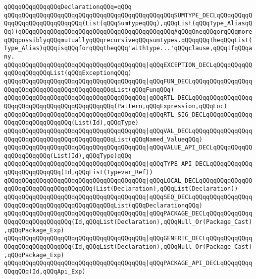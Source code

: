 \verb|qQQqqQQqqQQqqQQqDeclarationqQQq=qQQq|\newline
\verb|qQQqqQQqqQQqqQQqqQQqqQQqqQQqqQQqqQQqqQQqqQQqqQQqSUMTYPE_DECLqQQqqQQqqQQqqQQqqQQqqQQqqQQqqQQq(List(qQQqSumtypeqQQq),qQQqList(qQQqType_AliasqQQq))qQQqqQQqqQQqqQQqqQQqqQQqqQQqqQQqqQQqqQQqqQQq#qQQqOneqQQqorqQQqmoreqQQqpossiblyqQQqmutuallyqQQqrecursiveqQQqsumtypes.qQQqqQQqTheqQQqList(Type_Alias)qQQqisqQQqforqQQqtheqQQq'withtype...'qQQqclause,qQQqifqQQqany.|\newline
\verb|qQQqqQQqqQQqqQQqqQQqqQQqqQQqqQQqqQQqqQQq|\verb#|qQQqEXCEPTION_DECLqQQqqQQqqQQqqQQqqQQqqQQqList(qQQqExceptionqQQq)#\newline
\verb|qQQqqQQqqQQqqQQqqQQqqQQqqQQqqQQqqQQqqQQq|\verb#|qQQqFUN_DECLqQQqqQQqqQQqqQQqqQQqqQQqqQQqqQQqqQQqqQQqqQQqqQQqList(qQQqFunqQQq)#\newline
\verb|qQQqqQQqqQQqqQQqqQQqqQQqqQQqqQQqqQQqqQQq|\verb#|qQQqRTL_DECLqQQqqQQqqQQqqQQqqQQqqQQqqQQqqQQqqQQqqQQqqQQqqQQq(Pattern,qQQqExpression,qQQqLoc)#\newline
\verb|qQQqqQQqqQQqqQQqqQQqqQQqqQQqqQQqqQQqqQQq|\verb#|qQQqRTL_SIG_DECLqQQqqQQqqQQqqQQqqQQqqQQqqQQqqQQq(List(Id),qQQqType)#\newline
\verb|qQQqqQQqqQQqqQQqqQQqqQQqqQQqqQQqqQQqqQQq|\verb#|qQQqVAL_DECLqQQqqQQqqQQqqQQqqQQqqQQqqQQqqQQqqQQqqQQqqQQqqQQqList(qQQqNamed_ValueqQQq)#\newline
\verb|qQQqqQQqqQQqqQQqqQQqqQQqqQQqqQQqqQQqqQQq|\verb#|qQQqVALUE_API_DECLqQQqqQQqqQQqqQQqqQQqqQQq(List(Id),qQQqType)qQQq#\newline
\verb|qQQqqQQqqQQqqQQqqQQqqQQqqQQqqQQqqQQqqQQq|\verb#|qQQqTYPE_API_DECLqQQqqQQqqQQqqQQqqQQqqQQqqQQq(Id,qQQqList(Typevar_Ref))#\newline
\verb|qQQqqQQqqQQqqQQqqQQqqQQqqQQqqQQqqQQqqQQq|\verb#|qQQqLOCAL_DECLqQQqqQQqqQQqqQQqqQQqqQQqqQQqqQQqqQQqqQQq(List(Declaration),qQQqList(Declaration))#\newline
\verb|qQQqqQQqqQQqqQQqqQQqqQQqqQQqqQQqqQQqqQQq|\verb#|qQQqSEQ_DECLqQQqqQQqqQQqqQQqqQQqqQQqqQQqqQQqqQQqqQQqqQQqqQQqList(qQQqDeclarationqQQq)#\newline
\verb|qQQqqQQqqQQqqQQqqQQqqQQqqQQqqQQqqQQqqQQq|\verb#|qQQqPACKAGE_DECLqQQqqQQqqQQqqQQqqQQqqQQqqQQqqQQq(Id,qQQqList(Declaration),qQQqNull_Or(Package_Cast),qQQqPackage_Exp)#\newline
\verb|qQQqqQQqqQQqqQQqqQQqqQQqqQQqqQQqqQQqqQQq|\verb#|qQQqGENERIC_DECLqQQqqQQqqQQqqQQqqQQqqQQqqQQqqQQq(Id,qQQqList(Declaration),qQQqNull_Or(Package_Cast),qQQqPackage_Exp)#\newline
\verb|qQQqqQQqqQQqqQQqqQQqqQQqqQQqqQQqqQQqqQQq|\verb#|qQQqPACKAGE_API_DECLqQQqqQQqqQQqqQQq(Id,qQQqApi_Exp)#\newline
